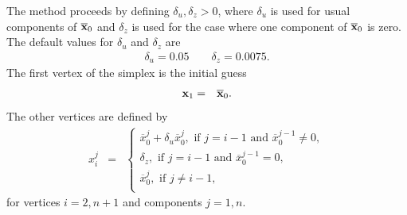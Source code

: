 The method proceeds by defining $\delta_u,\delta_z>0$, where 
$\delta_u$ is used for usual components of $\overline{\mathbf{x}}_0$ and $\delta_z$ is 
used for the case where one component of $\overline{\mathbf{x}}_0$ is zero.
The default values for $\delta_u$ and $\delta_z$ are 
\begin{eqnarray}
\delta_u = 0.05 \qquad \delta_z = 0.0075.
\end{eqnarray}
The first vertex of the simplex is the initial guess 
\begin{eqnarray}
\mathbf{x}_1 &=& \overline{\mathbf{x}}_0.
\end{eqnarray}
The other vertices are defined by 
\begin{eqnarray}
x_i^j &=& \left\{
\begin{array}{l}
\overline{x}_0^j + \delta_u \overline{x}_0^j, \textrm{ if } j=i-1 \textrm{ and } \overline{x}_0^{j-1}\neq 0,\\
\delta_z, \textrm{ if } j=i-1 \textrm{ and } \overline{x}_0^{j-1}= 0,\\
\overline{x}_0^j, \textrm{ if } j\neq i-1,\\
\end{array}
\right.
\end{eqnarray}
for vertices $i=2,n+1$ and components $j=1,n$.





